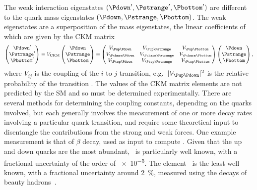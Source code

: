 The weak interaction eigenstates $(\Pdown', \Pstrange', \Pbottom')$ are 
different to the quark mass eigenstates $(\Pdown, \Pstrange, \Pbottom)$.
The weak eigenstates are a superposition of the mass eigenstates, the linear 
coefficients of which are given by the \ac{CKM} matrix
\begin{equation}
  \begin{pmatrix} \Pdown' \\ \Pstrange' \\ \Pbottom' \end{pmatrix}
  =
  V_{\text{CKM}}\begin{pmatrix} \Pdown \\ \Pstrange \\ \Pbottom \end{pmatrix}
  =
  \begin{pmatrix}
    \Vud & \Vus & \Vub \\
    \Vcd & \Vcs & \Vcb \\
    \Vtd & \Vts & \Vtb
  \end{pmatrix}
  \begin{pmatrix} \Pdown \\ \Pstrange \\ \Pbottom \end{pmatrix},
\end{equation}
where $V_{ij}$ is the coupling of the $i$ to $j$ transition, e.g.\ $|\Vud|^{2}$ 
is the relative probability of the transition \decay{\Pdown}{\Pup}.
The values of the \ac{CKM} matrix elements are not predicted by the \ac{SM} and 
so must be determined experimentally.
There are several methods for determining the coupling constants, depending on 
the quarks involved, but each generally involves the measurement of one or more 
decay rates involving a particular quark transition, and require some 
theoretical input to disentangle the contributions from the strong and weak 
forces.
One example measurement is that of $\beta$ decay, used as input to compute 
\Vud.
Given that the up and down quarks are the most abundant, \Vud\ is particularly 
well known, with a fractional uncertainty of the order of \num{e-5}.
The element \Vub\ is the least well known, with a fractional uncertainty around 
\SI{2}{\percent}, measured using the decays of beauty 
hadrons~\cite{Charles:2004jd}.

